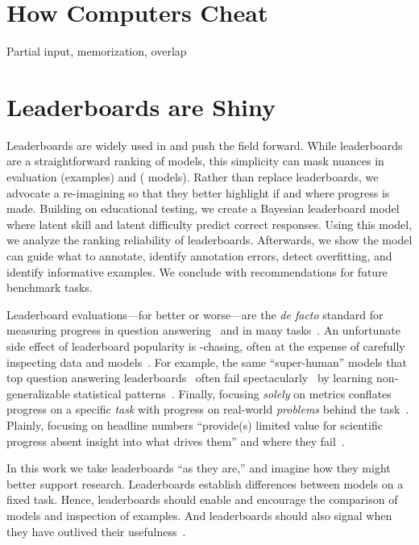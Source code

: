\section{How Computers Cheat}
\label{sec:cheating}

Partial input, memorization, overlap

\section{Leaderboards are Shiny}
\label{ch:isicle:intro}


Leaderboards are widely used in \nlp{} and push the field forward.  While
leaderboards are a straightforward ranking of \nlp{} models, this simplicity
can mask nuances in evaluation \itms{} (examples) and \subjs{} (\nlp{}
models).  Rather than replace leaderboards, we advocate a re-imagining so that
they better highlight if and where progress is made.  Building on educational
testing, we create a Bayesian leaderboard model where latent \subj{} skill and
latent \itm{} difficulty predict correct responses.  Using this model, we
analyze the ranking reliability of leaderboards.  Afterwards, we show the
model can guide what to annotate, identify annotation errors, detect
overfitting, and identify informative examples.  We conclude with
recommendations for future benchmark tasks.


Leaderboard evaluations---for better or worse---are the
\textit{de facto} standard for measuring progress in question
answering~\citep{rajpurkar-16} and in many \nlp{}
tasks~\citep{wang2019superglue}.
An unfortunate side effect of leaderboard popularity is -chasing, often at the expense of carefully inspecting data and models~\citep{linzen2020progress}.
For example, the same  ``super-human'' models that top question answering leaderboards~\citep{najberg-18} often fail spectacularly~\citep{Feng-18,wallace2019universal} by learning non-generalizable statistical patterns~\citep{mccoy2019heuristics,niven2019probing}.
Finally, focusing \textit{solely} on metrics conflates progress on a specific \emph{task} with progress on real-world \nlp{} \emph{problems} behind the task~\citep{bender2020climbing}.
Plainly, focusing on headline  numbers ``provide(s) limited value for scientific progress absent insight into what drives them'' and where they fail~\citep{lipton-19}.

In this work we take leaderboards ``as they are,'' and imagine how they
might better support research.
Leaderboards establish differences between
models on a fixed task.
Hence, leaderboards should enable and encourage the comparison of models and
inspection of examples.
And leaderboards should also signal when they have outlived their usefulness~\citep{Boyd-Graber-20}.

